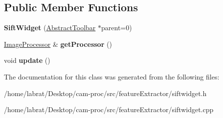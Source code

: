 \subsection*{Public Member Functions}
\begin{DoxyCompactItemize}
\item 
{\bfseries Sift\+Widget} (\hyperlink{classAbstractToolbar}{Abstract\+Toolbar} $\ast$parent=0)\hypertarget{classSiftWidget_ad64edab0ad7e88db8815da8e30c28a04}{}\label{classSiftWidget_ad64edab0ad7e88db8815da8e30c28a04}

\item 
\hyperlink{classImageProcessor}{Image\+Processor} \& {\bfseries get\+Processor} ()\hypertarget{classSiftWidget_a1991a0b2fc6f42f6b005aa7dd124c879}{}\label{classSiftWidget_a1991a0b2fc6f42f6b005aa7dd124c879}

\item 
void {\bfseries update} ()\hypertarget{classSiftWidget_a5aee0d2c6ea704f407067f6332b3428b}{}\label{classSiftWidget_a5aee0d2c6ea704f407067f6332b3428b}

\end{DoxyCompactItemize}


The documentation for this class was generated from the following files\+:\begin{DoxyCompactItemize}
\item 
/home/labrat/\+Desktop/cam-\/proc/src/feature\+Extractor/siftwidget.\+h\item 
/home/labrat/\+Desktop/cam-\/proc/src/feature\+Extractor/siftwidget.\+cpp\end{DoxyCompactItemize}
